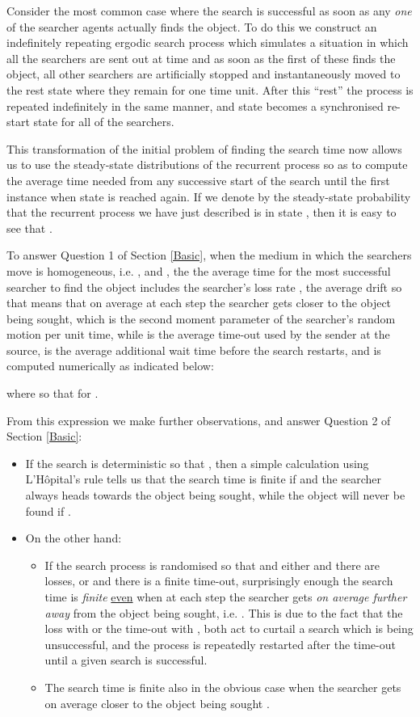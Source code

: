 \documentclass[journal]{IEEEtran}
\begin{document}
Consider the most common case where the search is successful as soon as any {\em one} of the  searcher agents actually finds the object.
To do this we construct an
indefinitely repeating ergodic search process which simulates a situation in which all the  searchers are sent out at time  and as soon as the first of these  finds the object, all other searchers are artificially stopped and instantaneously moved to the rest state where they remain for one time unit. After this ``rest''  the process is repeated indefinitely in the same manner, and state  becomes a synchronised re-start state for all of the searchers.

This transformation of the initial problem of finding the search time now allows us to use the steady-state distributions of the recurrent process so as to compute the average time  needed from any successive start of the search until the first instance when state  is reached again. If we denote by  the steady-state probability that the recurrent process we have just described is in state , then it is easy to see that .




To answer Question 1 of Section \ref{Basic}, when the medium in which the searchers move is homogeneous, i.e. ,  and ,  the
the average time  for
the most successful searcher to find the object \cite{Gelenbe2010} includes
the searcher's loss rate , the average drift  so that  means that on average at each step the searcher gets closer to the object being sought,
 which is the second moment parameter of the searcher's random motion per unit time, while  is the average time-out used by the sender at the source,  is the average additional wait time before the search restarts, and  is computed numerically as indicated below:

where  so that  for .

From this expression we make further observations,
and answer Question 2 of Section \ref{Basic}:
\begin{itemize}
\item If the search is deterministic so that , then a simple calculation
using L'H\^{o}pital's rule tells us that the search time is finite if  and the searcher always heads towards the object being sought,
while the object will never be found if .
\item On the other hand:
\begin{itemize}
\item If the search process is randomised so that   and either  and there are losses, or  and there is a finite time-out, surprisingly enough the search time is {\em finite}
\underline{even} when at each step the searcher gets {\em on average further away} from the object being sought, i.e. . This is due to the fact that the
loss with  or the time-out with , both act to curtail a search which is being unsuccessful, and the process is repeatedly restarted after the time-out
until a given search is successful.
\item The search time is finite also in the obvious case when the searcher gets on average closer to the object being sought .
\end{itemize}
\end{itemize}
\end{document}
